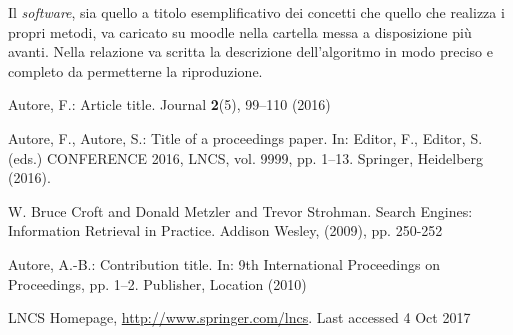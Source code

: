 \documentclass[runningheads]{llncs}
\begin{document}
Il \textit{software}, sia quello a titolo esemplificativo dei concetti
che quello che realizza i propri metodi, va caricato su moodle nella
cartella messa a disposizione pi\`u avanti.  Nella relazione va
scritta la descrizione dell'algoritmo in modo preciso e completo da
permetterne la riproduzione.

\begin{thebibliography}{8}
Autore, F.: Article title. Journal \textbf{2}(5), 99--110 (2016)

Autore, F., Autore, S.: Title of a proceedings paper. In: Editor,
F., Editor, S. (eds.) CONFERENCE 2016, LNCS, vol. 9999, pp. 1--13.
Springer, Heidelberg (2016). 

W. Bruce Croft and Donald Metzler and Trevor Strohman. Search Engines: Information Retrieval in Practice. Addison Wesley, (2009), pp. 250-252

Autore, A.-B.: Contribution title. In: 9th International Proceedings
on Proceedings, pp. 1--2. Publisher, Location (2010)

LNCS Homepage, \url{http://www.springer.com/lncs}. Last accessed 4
Oct 2017
\end{thebibliography}

\begin{figure}[h!]
\end{figure}
\end{document}
